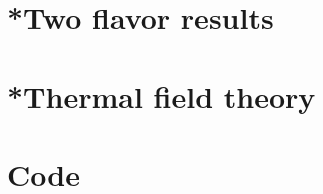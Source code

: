 \documentclass{book}
\begin{document}
    \chapter[Appendix A]{}
    \label{appendix: A}
    
    
    
    
    

    \chapter{*Two flavor results}
    \label{appendix: two flavor results}
    
    
    
    
    \chapter{*Thermal field theory}
    \label{appendix: thermal field theory}
    
    
    
    
    
    
    
    \chapter{Code}
    

    \cleardoublepage
    \printbibliography
\end{document}
